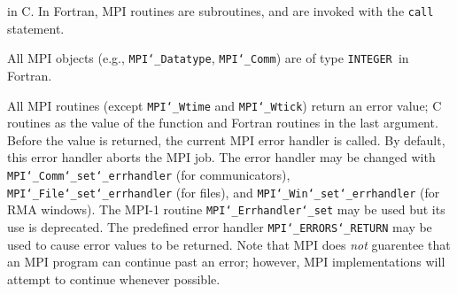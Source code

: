 in C.  In Fortran, MPI routines are subroutines, and are invoked with the
{\tt call} statement.
\par
All MPI objects (e.g., {\tt MPI{\tt \char`\_}Datatype}, {\tt MPI{\tt \char`\_}Comm}) are of type {\tt INTEGER
}in Fortran.
\par
{}
\par
All MPI routines (except {\tt MPI{\tt \char`\_}Wtime} and {\tt MPI{\tt \char`\_}Wtick}) return an error value;
C routines as the value of the function and Fortran routines in the last
argument.  Before the value is returned, the current MPI error handler is
called.  By default, this error handler aborts the MPI job.  The error handler
may be changed with {\tt MPI{\tt \char`\_}Comm{\tt \char`\_}set{\tt \char`\_}errhandler} (for communicators),
{\tt MPI{\tt \char`\_}File{\tt \char`\_}set{\tt \char`\_}errhandler} (for files), and {\tt MPI{\tt \char`\_}Win{\tt \char`\_}set{\tt \char`\_}errhandler} (for
RMA windows).  The MPI-1 routine {\tt MPI{\tt \char`\_}Errhandler{\tt \char`\_}set} may be used but
its use is deprecated.  The predefined error handler
{\tt MPI{\tt \char`\_}ERRORS{\tt \char`\_}RETURN} may be used to cause error values to be returned.
Note that MPI does {\em not} guarentee that an MPI program can continue past
an error; however, MPI implementations will attempt to continue whenever
possible.
\par
{}
\endmanpage
